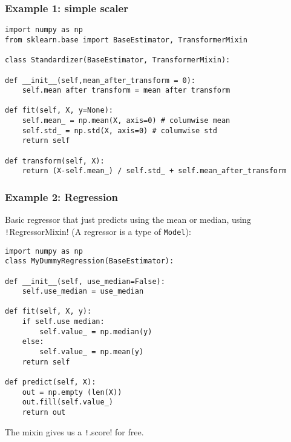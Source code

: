 \documentclass[11pt]{article}
\theoremstyle{definition}
\begin{document}
\subsubsection{Example 1: simple scaler}
\begin{verbatim}
import numpy as np
from sklearn.base import BaseEstimator, TransformerMixin

class Standardizer(BaseEstimator, TransformerMixin):

def __init__(self,mean_after_transform = 0):
    self.mean after transform = mean after transform
    
def fit(self, X, y=None):
    self.mean_ = np.mean(X, axis=0) # columwise mean
    self.std_ = np.std(X, axis=0) # columwise std
    return self
    
def transform(self, X):
    return (X-self.mean_) / self.std_ + self.mean_after_transform
\end{verbatim}
\subsubsection{Example 2: Regression}
Basic regressor that just predicts using the mean or median, using  \texttt!RegressorMixin! (A regressor is a type of \texttt{Model}):
\begin{verbatim}
import numpy as np
class MyDummyRegression(BaseEstimator):

def __init__(self, use_median=False):
    self.use_median = use_median
    
def fit(self, X, y):
    if self.use median:
        self.value_ = np.median(y)
    else:
        self.value_ = np.mean(y)
    return self
    
def predict(self, X):
    out = np.empty (len(X))
    out.fill(self.value_)
    return out
\end{verbatim}
The mixin gives us a \texttt!.score! for free.
\end{document}
